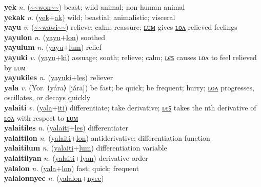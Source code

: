\textbf{yek} \textit{n.} (\hyperref[won]{\~{}\~{}won\~{}\~{}})
beast; wild animal; non-human animal \label{yek} \\
\textbf{yekak} \textit{n.} (\hyperref[yek]{yek}+\hyperref[ak]{ak})
wild; beastial; animalistic; visceral \label{yekak} \\
\textbf{yayu} \textit{v.} (\hyperref[wawi]{\~{}\~{}wawi\~{}\~{}})
relieve; calm; reassure; \hyperref[yayulum]{ʟᴜᴍ} gives \hyperref[yayulon]{ʟᴏᴧ} relieved feelings \label{yayu} \\
\textbf{yayulon} \textit{n.} (\hyperref[yayu]{yayu}+\hyperref[lon]{lon})
soothed \label{yayulon} \\
\textbf{yayulum} \textit{n.} (\hyperref[yayu]{yayu}+\hyperref[lum]{lum})
relief \label{yayulum} \\
\textbf{yayuki} \textit{v.} (\hyperref[yayu]{yayu}+\hyperref[ki]{ki})
assuage; sooth; relieve; calm; \hyperref[yayukiles]{ʟєꜱ} causes ʟᴏᴧ to feel relieved by ʟᴜᴍ \label{yayuki} \\
\textbf{yayukiles} \textit{n.} (\hyperref[yayuki]{yayuki}+\hyperref[les]{les})
reliever \label{yayukiles} \\
\textbf{yala} \textit{v.} (Yor. ⟨yára⟩ [járā])
be fast; be quick; be frequent; hurry; \hyperref[yalalon]{ʟᴏᴧ} progresses, oscillates, or decays quickly \label{yala} \\
\textbf{yalaiti} \textit{v.} (\hyperref[yala]{yala}+\hyperref[iti]{iti})
differentiate; take derivative; \hyperref[yalaitiles]{ʟєꜱ} takes the nth derivative of \hyperref[yalaitilon]{ʟᴏᴧ} with respect to \hyperref[yalaitilum]{ʟᴜᴍ} \label{yalaiti} \\
\textbf{yalaitiles} \textit{n.} (\hyperref[yalaiti]{yalaiti}+\hyperref[les]{les})
differentiater \label{yalaitiles} \\
\textbf{yalaitilon} \textit{n.} (\hyperref[yalaiti]{yalaiti}+\hyperref[lon]{lon})
antiderivative; differentiation function \label{yalaitilon} \\
\textbf{yalaitilum} \textit{n.} (\hyperref[yalaiti]{yalaiti}+\hyperref[lum]{lum})
differentiation variable \label{yalaitilum} \\
\textbf{yalaitilyan} \textit{n.} (\hyperref[yalaiti]{yalaiti}+\hyperref[lyan]{lyan})
derivative order \label{yalaitilyan} \\
\textbf{yalalon} \textit{n.} (\hyperref[yala]{yala}+\hyperref[lon]{lon})
fast; quick; frequent \label{yalalon} \\
\textbf{yalalonnyec} \textit{n.} (\hyperref[yalalon]{yalalon}+\hyperref[nyec]{nyec})
